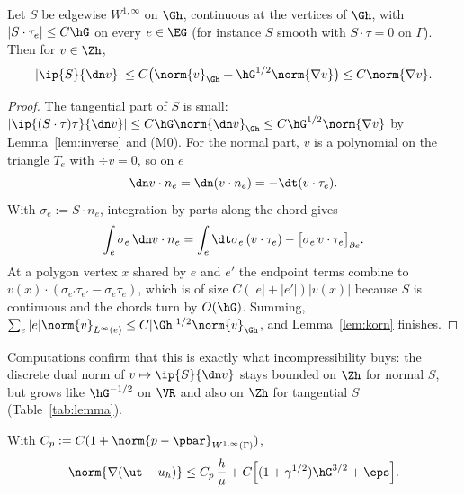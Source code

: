 \begin{lemma}\label{lem:cancel}
Let $S$ be edgewise $W^{1,\infty}$ on $\Gh$, continuous at the vertices of $\Gh$, with $|S\cdot\tau_e|\le C\hG$ on every $e\in\EG$ (for instance $S$ smooth with $S\cdot\tau=0$ on $\Gamma$). Then for $v\in\Zh$,
\[
|\ip{S}{\dn v}|\le C\bigl(\norm{v}_{\Gh}+\hG^{1/2}\norm{\nabla v}\bigr)\le C\norm{\nabla v}.
\]
\end{lemma}

\begin{proof}
The tangential part of $S$ is small: $|\ip{(S\cdot\tau)\tau}{\dn v}|\le C\hG\norm{\dn v}_{\Gh}\le C\hG^{1/2}\norm{\nabla v}$ by Lemma~\ref{lem:inverse} and (M0). For the normal part, $v$ is a polynomial on the triangle $T_e$ with $\div v=0$, so on $e$
\[
\dn v\cdot n_e=\dn(v\cdot n_e)=-\dt(v\cdot\tau_e).
\]
With $\sigma_e:=S\cdot n_e$, integration by parts along the chord gives
\[
\int_e\sigma_e\,\dn v\cdot n_e=\int_e\dt\sigma_e\,(v\cdot\tau_e)-\bigl[\sigma_e\,v\cdot\tau_e\bigr]_{\partial e}.
\]
At a polygon vertex $x$ shared by $e$ and $e'$ the endpoint terms combine to $v(x)\cdot(\sigma_{e'}\tau_{e'}-\sigma_e\tau_e)$, which is of size $C(|e|+|e'|)|v(x)|$ because $S$ is continuous and the chords turn by $O(\hG)$. Summing, $\sum_e|e|\norm{v}_{L^\infty(e)}\le C|\Gh|^{1/2}\norm{v}_{\Gh}$, and Lemma~\ref{lem:korn} finishes.
\end{proof}

Computations confirm that this is exactly what incompressibility buys: the discrete dual norm of $v\mapsto\ip{S}{\dn v}$ stays bounded on $\Zh$ for normal $S$, but grows like $\hG^{-1/2}$ on $\VR$ and also on $\Zh$ for tangential $S$ (Table~\ref{tab:lemma}).

\begin{theorem}\label{thm:C}
With $C_p:=C(1+\norm{p-\pbar}_{W^{1,\infty}(\Gamma)})$,
\[
\norm{\nabla(\ut-u_h)}\le C_p\,\frac h\mu+C\Bigl[(1+\gamma^{1/2})\hG^{3/2}+\eps\Bigr].
\]
\end{theorem}

